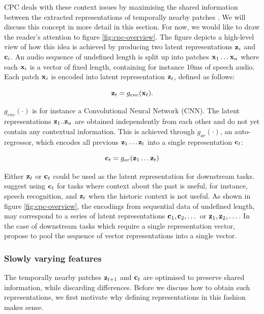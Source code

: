 	CPC deals with these context issues by maximising the shared information between the extracted representations of temporally nearby patches \citep{lowePuttingEndEndtoEnd2020a}. We will discuss this concept in more detail in this section. For now, we would like to draw the reader's attention to figure \ref{fig:cpc-overview}. The figure depicts a high-level view of how this idea is achieved by producing two latent representations $\mathbf{z}_i$ and $\mathbf{c}_i$. An audio sequence of undefined length is split up into patches $\mathbf{x}_1 \dots \mathbf{x}_n$ where each $\mathbf{x}_i$ is a vector of fixed length, containing for instance 10ms of speech audio. Each patch $\mathbf{x}_i$ is encoded into latent representation $\mathbf{z}_t$, defined as follows:
	
	$$
	\mathbf{z}_t = g_{enc}(\mathbf{x}_t) .
	$$
	
	$g_{enc}( \cdot )$ is for instance a Convolutional Neural Network (CNN). The latent representations $\mathbf{z}_1..\mathbf{z}_n$ are obtained independently from each other and do not yet contain any contextual information. This is achieved through $g_{ar}( \cdot )$, an auto-regressor, which encodes all previous $\mathbf{z}_1 \dots \mathbf{z}_t$ into a single representation $\mathbf{c}_t$:
	
	$$
	\mathbf{c}_t = g_{ar}(\mathbf{z}_1 \dots \mathbf{z}_t)
	$$
	
	Either $\mathbf{z}_t$ or $\mathbf{c}_t$ could be used as the latent representation for downstream tasks. \cite{oordRepresentationLearningContrastive2019} suggest using $\mathbf{c}_t$ for tasks where context about the past is useful, for instance, speech recognition, and $\mathbf{z}_t$ when the historic context is not useful. As shown in figure \ref{fig:cpc-overview}, the encodings from sequential data of undefined length, may correspond to a series of latent representations $\mathbf{c}_1, \mathbf{c}_2, \dots $ or $\mathbf{z}_1, \mathbf{z}_2, \dots $. In the case of downstream tasks which require a single representation vector, \citeauthor{oordRepresentationLearningContrastive2019} propose to pool the sequence of vector representations into a single vector.
	

\subsubsection{Slowly varying features}
	The temporally nearby patches $\mathbf{z}_{t+1}$ and $\mathbf{c}_t$ are optimised to preserve shared information, while discarding differences. Before we discuss how to obtain such representations, we first motivate why defining representations in this fashion makes sense.
	
